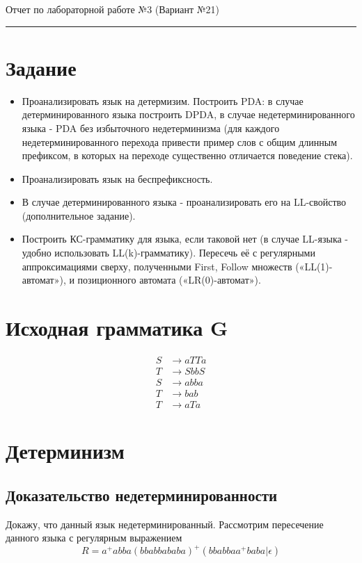 \documentclass[12pt,a4paper]{article}
\begin{document}
{\Large\bfseries
\begin{flushleft}
Отчет по лабораторной работе №3 (Вариант №21)
\end{flushleft}}
\vspace{0.5em}\hrule\vspace{1.2em}

\section*{Задание}
\begin{itemize}
  \item Проанализировать язык на детермизим. Построить PDA: в случае детерминированного языка построить DPDA, в случае недетерминированного языка - PDA без избыточного недетерминизма (для каждого недетерминированного перехода привести пример слов с общим длинным префиксом, в которых на переходе существенно отличается поведение стека). 
  \item Проанализировать язык на беспрефиксность.
  \item В случае детерминированного языка - проанализировать его на LL-свойство (дополнительное задание).
  \item Построить КС-грамматику для языка, если таковой нет (в случае LL-языка - удобно использовать LL(k)-грамматику). Пересечь её с регулярными аппроксимациями сверху, полученными First, Follow множеств («LL(1)-автомат»), и позиционного автомата («LR(0)-автомат»).
\end{itemize}

\section*{Исходная грамматика G}
\[
\begin{aligned}
S &\to aTTa \\
T &\to SbbS \\
S &\to abba \\
T &\to bab \\
T &\to aTa
\end{aligned}
\]

\newpage

\section*{Детерминизм}
\subsection*{Доказательство недетерминированности}
Докажу, что данный язык недетерминированный. Рассмотрим пересечение данного языка с регулярным выражением
\[
R = a^{+}abba(bbabbababa)^{+}(bbabbaa^{+}baba|\epsilon)
\]
\end{document}

